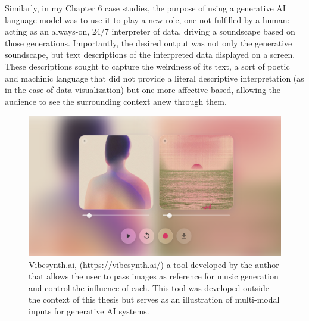 Similarly, in my Chapter 6 case studies, the purpose of using a generative AI language model was to use it to play a new role, one not fulfilled by a human: acting as an always-on, 24/7 interpreter of data, driving a soundscape based on those generations. Importantly, the desired output was not only the generative soundscape, but text descriptions of the interpreted data displayed on a screen. These descriptions sought to capture the weirdness of its text, a sort of poetic and machinic language that did not provide a literal descriptive interpretation (as in the case of data visualization) but one more affective-based, allowing the audience to see the surrounding context anew through them.

\begin{figure}[H]
    \centering
    \includegraphics[width=.75\linewidth]{vibesynth.png}
    \caption{Vibesynth.ai, (https://vibesynth.ai/) a tool developed by the author that allows the user to pass images as reference for music generation and control the influence of each. This tool was developed outside the context of this thesis but serves as an illustration of multi-modal inputs for generative AI systems.}
    \label{fig:vibesynth}
\end{figure}

